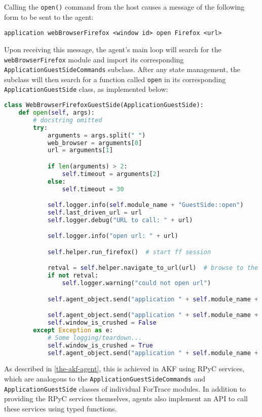\documentclass[letterpaper,12pt]{report}
\newcommand{\passthrough}[1]{#1}
\begin{document}
Calling the \passthrough{\lstinline!open()!} command from the host
causes a message of the following form to be sent to the agent:

\begin{lstlisting}
application webBrowserFirefox <window id> open Firefox <url>
\end{lstlisting}

Upon receiving this message, the agent's main loop will search for the
\passthrough{\lstinline!webBrowserFirefox!} module and import its
corresponding \passthrough{\lstinline!ApplicationGuestSideCommands!}
subclass. After any state management, the subclass will then search for
a function called \passthrough{\lstinline!open!} in its corresponding
\passthrough{\lstinline!ApplicationGuestSide!} class, as implemented
below:

\begin{lstlisting}[language=Python]
class WebBrowserFirefoxGuestSide(ApplicationGuestSide):
    def open(self, args):
        # docstring omitted
        try:
            arguments = args.split(" ")
            web_browser = arguments[0]
            url = arguments[1]

            if len(arguments) > 2:
                self.timeout = arguments[2]
            else:
                self.timeout = 30

            self.logger.info(self.module_name + "GuestSide::open")
            self.last_driven_url = url
            self.logger.debug("URL to call: " + url)

            self.logger.info("open url: " + url)

            self.helper.run_firefox()  # start ff session

            retval = self.helper.navigate_to_url(url)  # browse to the specified url
            if not retval:
                self.logger.warning("could not open url")

            self.agent_object.send("application " + self.module_name + " " + str(self.window_id) + " opened")

            self.agent_object.send("application " + self.module_name + " " + str(self.window_id) + " ready")
            self.window_is_crushed = False
        except Exception as e:
            # Some logging/teardown...
            self.window_is_crushed = True
            self.agent_object.send("application " + self.module_name + " " + str(self.window_id) + " error")
\end{lstlisting}

As described in \autoref{the-akf-agent}, this is achieved in AKF using RPyC services, which are analogous
to the \passthrough{\lstinline!ApplicationGuestSideCommands!} and
\passthrough{\lstinline!ApplicationGuestSide!} classes of individual
ForTrace modules. In addition to providing the RPyC services themselves,
agents also implement an API to call these services using typed
functions.
\end{document}
